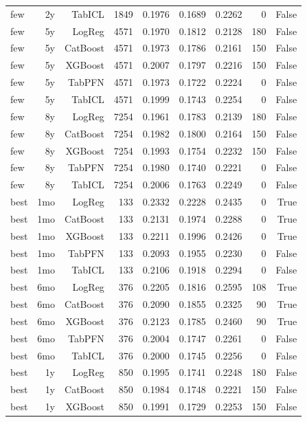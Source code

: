 \begin{table}[t]
\begin{tabular}{lrrrrrrrr}
  few & 2y & TabICL & 1849 & 0.1976 & 0.1689 & 0.2262 & 0 & False \\
  few & 5y & LogReg & 4571 & 0.1970 & 0.1812 & 0.2128 & 180 & False \\
  few & 5y & CatBoost & 4571 & 0.1973 & 0.1786 & 0.2161 & 150 & False \\
  few & 5y & XGBoost & 4571 & 0.2007 & 0.1797 & 0.2216 & 150 & False \\
  few & 5y & TabPFN & 4571 & 0.1973 & 0.1722 & 0.2224 & 0 & False \\
  few & 5y & TabICL & 4571 & 0.1999 & 0.1743 & 0.2254 & 0 & False \\
  few & 8y & LogReg & 7254 & 0.1961 & 0.1783 & 0.2139 & 180 & False \\
  few & 8y & CatBoost & 7254 & 0.1982 & 0.1800 & 0.2164 & 150 & False \\
  few & 8y & XGBoost & 7254 & 0.1993 & 0.1754 & 0.2232 & 150 & False \\
  few & 8y & TabPFN & 7254 & 0.1980 & 0.1740 & 0.2221 & 0 & False \\
  few & 8y & TabICL & 7254 & 0.2006 & 0.1763 & 0.2249 & 0 & False \\
  best & 1mo & LogReg & 133 & 0.2332 & 0.2228 & 0.2435 & 0 & True \\
  best & 1mo & CatBoost & 133 & 0.2131 & 0.1974 & 0.2288 & 0 & True \\
  best & 1mo & XGBoost & 133 & 0.2211 & 0.1996 & 0.2426 & 0 & True \\
  best & 1mo & TabPFN & 133 & 0.2093 & 0.1955 & 0.2230 & 0 & False \\
  best & 1mo & TabICL & 133 & 0.2106 & 0.1918 & 0.2294 & 0 & False \\
  best & 6mo & LogReg & 376 & 0.2205 & 0.1816 & 0.2595 & 108 & True \\
  best & 6mo & CatBoost & 376 & 0.2090 & 0.1855 & 0.2325 & 90 & True \\
  best & 6mo & XGBoost & 376 & 0.2123 & 0.1785 & 0.2460 & 90 & True \\
  best & 6mo & TabPFN & 376 & 0.2004 & 0.1747 & 0.2261 & 0 & False \\
  best & 6mo & TabICL & 376 & 0.2000 & 0.1745 & 0.2256 & 0 & False \\
  best & 1y & LogReg & 850 & 0.1995 & 0.1741 & 0.2248 & 180 & False \\
  best & 1y & CatBoost & 850 & 0.1984 & 0.1748 & 0.2221 & 150 & False \\
  best & 1y & XGBoost & 850 & 0.1991 & 0.1729 & 0.2253 & 150 & False \\

\end{tabular}
\end{table}
